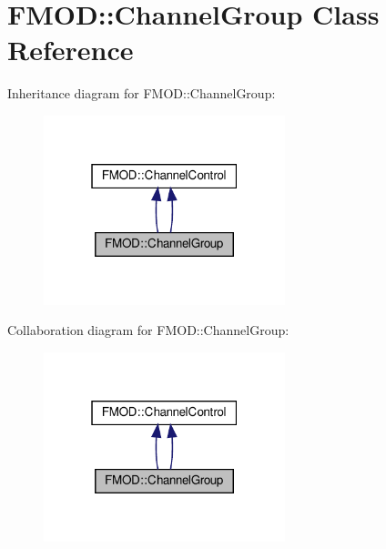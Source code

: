 \hypertarget{classFMOD_1_1ChannelGroup}{}\section{F\+M\+OD\+:\+:Channel\+Group Class Reference}
\label{classFMOD_1_1ChannelGroup}


Inheritance diagram for F\+M\+OD\+:\+:Channel\+Group\+:
\nopagebreak
\begin{figure}[H]
\begin{center}
\leavevmode
\includegraphics[width=199pt]{classFMOD_1_1ChannelGroup__inherit__graph}
\end{center}
\end{figure}


Collaboration diagram for F\+M\+OD\+:\+:Channel\+Group\+:
\nopagebreak
\begin{figure}[H]
\begin{center}
\leavevmode
\includegraphics[width=199pt]{classFMOD_1_1ChannelGroup__coll__graph}
\end{center}
\end{figure}
